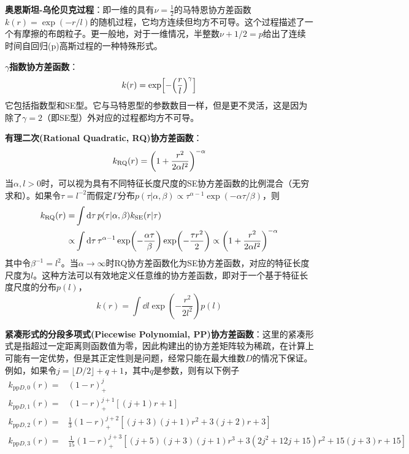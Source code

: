 \documentclass[12pt,UTF8]{article}
\begin{document}
                \textbf{奥恩斯坦-乌伦贝克过程}：即一维的具有$\nu=\frac{1}{2}$的马特恩协方差函数$k(r)=\exp(-r/l)$的随机过程，它均方连续但均方不可导。这个过程描述了一个有摩擦的布朗粒子。更一般地，对于一维情况，半整数$\nu+1/2=p$给出了连续时间自回归(p)高斯过程的一种特殊形式。\par
                \textbf{$\gamma$指数协方差函数}：
                \begin{equation}
                    k(r)=\exp[-\qty(\frac{r}{l})^\gamma]
                \end{equation}
                它包括指数型和SE型。它与马特恩型的参数数目一样，但是更不灵活，这是因为除了$\gamma=2$（即SE型）外对应的过程都均方不可导。\par
                \textbf{有理二次(Rational Quadratic, RQ)协方差函数}：
                \begin{equation}
                    k_{\mathrm{RQ}}(r)=\qty(1+\frac{r^2}{2\alpha l^2})^{-\alpha}
                \end{equation}
                当$\alpha,l>0$时，可以视为具有不同特征长度尺度的SE协方差函数的比例混合（无穷求和）。如果令$\tau=l^{-2}$而假定$\Gamma$分布$p(\tau|\alpha,\beta)\propto\tau^{\alpha-1}\exp(-\alpha\tau/\beta)$，则
                \begin{align}
                    k_{\mathrm{RQ}}(r)=&\int{\dd{\tau}p(\tau|\alpha,\beta)k_{\mathrm{SE}}(r|\tau)} \\
                    \propto&\int{\dd{\tau}\tau^{\alpha-1}\exp(-\frac{\alpha\tau}{\beta})\exp(-\frac{\tau r^2}{2})}\propto\qty(1+\frac{r^2}{2\alpha l^2})^{-\alpha}
                \end{align}
                其中令$\beta^{-1}=l^2$。当$\alpha\rightarrow\infty$时RQ协方差函数化为SE协方差函数，对应的特征长度尺度为$l$。这种方法可以有效地定义任意维的协方差函数，即对于一个基于特征长度尺度的分布$p(l)$，
                \begin{equation}
                    k(r)=\int{\dd{l}\exp(-\frac{r^2}{2l^2})p(l)}
                \end{equation}\par
                \textbf{紧凑形式的分段多项式(Piecewise Polynomial, PP)协方差函数}：这里的紧凑形式是指超过一定距离则函数值为零，因此构建出的协方差矩阵较为稀疏，在计算上可能有一定优势，但是其正定性则是问题，经常只能在最大维数$D$的情况下保证。例如，如果令$j=\lfloor D/2\rfloor+q+1$，其中$q$是参数，则有以下例子
                \begin{align}
                    k_{\mathrm{pp}D,0}(r)=&(1-r)^j_+ \\
                    k_{\mathrm{pp}D,1}(r)=&(1-r)^{j+1}_+[(j+1)r+1] \\
                    k_{\mathrm{pp}D,2}(r)=&\frac{1}{3}(1-r)^{j+2}_+[(j+3)(j+1)r^2+3(j+2)r+3] \\
                    k_{\mathrm{pp}D,3}(r)=&\frac{1}{15}(1-r)^{j+3}_+[(j+5)(j+3)(j+1)r^3+3(2j^2+12j+15)r^2+15(j+3)r+15]
                \end{align}
\end{document}
